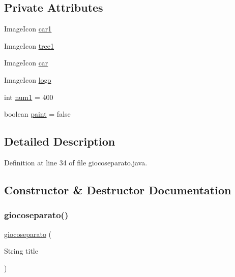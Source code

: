 \subsection*{Private Attributes}
\begin{DoxyCompactItemize}
\item 
Image\+Icon \hyperlink{classcargame_1_1giocoseparato_aec399eec6c9bd560115ca6b2a2d6dd70}{car1}
\item 
Image\+Icon \hyperlink{classcargame_1_1giocoseparato_ae7ee0b8463d4706a05c52012d15ace23}{tree1}
\item 
Image\+Icon \hyperlink{classcargame_1_1giocoseparato_a19d12f9f1abcf9721429eb73637ab0ee}{car}
\item 
Image\+Icon \hyperlink{classcargame_1_1giocoseparato_ab53a18d39d9e70a1cc24035798e1011a}{logo}
\item 
int \hyperlink{classcargame_1_1giocoseparato_ad023fa22fc14680886cc9bb170cbc099}{num1} = 400
\item 
boolean \hyperlink{classcargame_1_1giocoseparato_a88adf831b3879e064aff0ac1c19b8da3}{paint} = false
\end{DoxyCompactItemize}


\subsection{Detailed Description}


Definition at line 34 of file giocoseparato.\+java.



\subsection{Constructor \& Destructor Documentation}
\mbox{\label{classcargame_1_1giocoseparato_ae3a253caf075ef5655f9a36ef21b6852}} 
\subsubsection{\texorpdfstring{giocoseparato()}{giocoseparato()}}
{\footnotesize\ttfamily \hyperlink{classcargame_1_1giocoseparato}{giocoseparato} (\begin{DoxyParamCaption}\item[{String}]{title }\end{DoxyParamCaption})}

